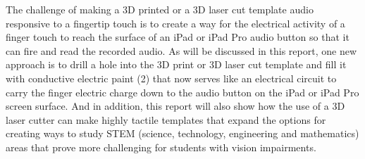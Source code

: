 \documentclass[11.5pt]{sig-alternate} %
\begin{document}
\begin{large}
The challenge of making a 3D printed or a 3D laser cut template audio responsive to a fingertip touch is to create a way for the electrical activity of a finger touch to reach the surface of an iPad or iPad Pro audio button so that it can fire and read the recorded audio.  As will be discussed in this report, one new approach is to drill a hole into the 3D print or 3D laser cut template and fill it with conductive electric paint (2) that now serves like an electrical circuit to carry the finger electric charge down to the audio button on the iPad or iPad Pro screen surface.  And in addition, this report will also show how the use of a 3D laser cutter can make highly tactile templates that expand the options for creating ways to study STEM (science, technology, engineering and mathematics) areas that prove more challenging for students with vision impairments.        


\end{large}
\end{document}
